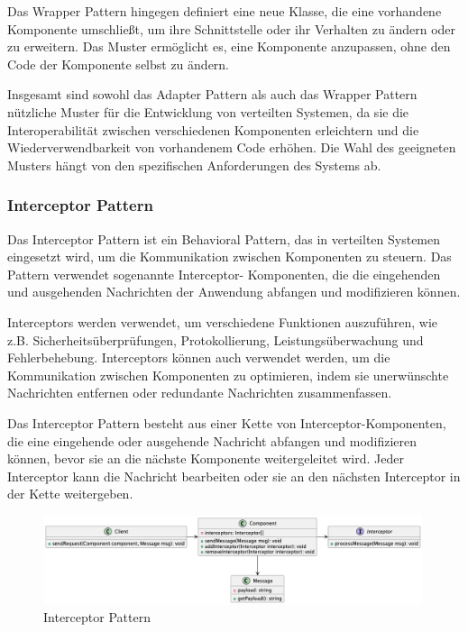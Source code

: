 Das Wrapper Pattern hingegen definiert eine neue Klasse, die eine vorhandene Komponente umschließt, um ihre Schnittstelle oder ihr Verhalten zu ändern oder zu erweitern. Das Muster ermöglicht es, eine Komponente anzupassen, ohne den Code der Komponente selbst zu ändern. 

Insgesamt sind sowohl das Adapter Pattern als auch das Wrapper Pattern nützliche Muster für die Entwicklung von verteilten Systemen, da sie die Interoperabilität zwischen verschiedenen Komponenten erleichtern und die Wiederverwendbarkeit von vorhandenem Code erhöhen. Die Wahl des geeigneten Musters hängt von den spezifischen Anforderungen des Systems ab.


\subsubsection{Interceptor Pattern}
Das Interceptor Pattern ist ein Behavioral Pattern, das in verteilten Systemen eingesetzt wird, um die Kommunikation zwischen Komponenten zu steuern. Das Pattern verwendet sogenannte Interceptor- Komponenten, die die eingehenden und ausgehenden Nachrichten der Anwendung abfangen und modifizieren können.

Interceptors werden verwendet, um verschiedene Funktionen auszuführen, wie z.B. Sicherheitsüberprüfungen, Protokollierung, Leistungsüberwachung und Fehlerbehebung. Interceptors können auch verwendet werden, um die Kommunikation zwischen Komponenten zu optimieren, indem sie unerwünschte Nachrichten entfernen oder redundante Nachrichten zusammenfassen.

Das Interceptor Pattern besteht aus einer Kette von Interceptor-Komponenten, die eine eingehende oder ausgehende Nachricht abfangen und modifizieren können, bevor sie an die nächste Komponente weitergeleitet wird. Jeder Interceptor kann die Nachricht bearbeiten oder sie an den nächsten Interceptor in der Kette weitergeben.

\begin{figure}[!ht]
  \centering
  \includegraphics[width=0.99\textwidth]{fig/uml/intercept-class.png}
  \caption{Interceptor Pattern}
  \label{fig:intercept-class}
\end{figure}

